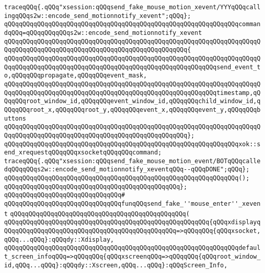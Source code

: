 \verb|traceqQQq{.qQQq"xsession:qQQqsend_fake_mouse_motion_xevent/YYYqQQqcallingqQQqs2w::encode_send_motionnotify_xevent";qQQq};|\newline
\verb|qQQqqQQqqQQqqQQqqQQqqQQqqQQqqQQqqQQqqQQqqQQqqQQqqQQqqQQqqQQqqQQqcommandqQQq=qQQqqQQqqQQqs2w::encode_send_motionnotify_xevent|\newline
\verb|qQQqqQQqqQQqqQQqqQQqqQQqqQQqqQQqqQQqqQQqqQQqqQQqqQQqqQQqqQQqqQQqqQQqqQQqqQQqqQQqqQQqqQQqqQQqqQQqqQQqqQQqqQQqqQQqqQQqqQQq{|\newline
\verb|qQQqqQQqqQQqqQQqqQQqqQQqqQQqqQQqqQQqqQQqqQQqqQQqqQQqqQQqqQQqqQQqqQQqqQQqqQQqqQQqqQQqqQQqqQQqqQQqqQQqqQQqqQQqqQQqqQQqqQQqqQQqqQQqsend_event_to,qQQqqQQqpropagate,qQQqqQQqevent_mask,|\newline
\verb|qQQqqQQqqQQqqQQqqQQqqQQqqQQqqQQqqQQqqQQqqQQqqQQqqQQqqQQqqQQqqQQqqQQqqQQqqQQqqQQqqQQqqQQqqQQqqQQqqQQqqQQqqQQqqQQqqQQqqQQqqQQqqQQqtimestamp,qQQqqQQqroot_window_id,qQQqqQQqevent_window_id,qQQqqQQqchild_window_id,qQQqqQQqroot_x,qQQqqQQqroot_y,qQQqqQQqevent_x,qQQqqQQqevent_y,qQQqqQQqbuttons|\newline
\verb|qQQqqQQqqQQqqQQqqQQqqQQqqQQqqQQqqQQqqQQqqQQqqQQqqQQqqQQqqQQqqQQqqQQqqQQqqQQqqQQqqQQqqQQqqQQqqQQqqQQqqQQqqQQqqQQqqQQqqQQq};|\newline
\newline
\verb|qQQqqQQqqQQqqQQqqQQqqQQqqQQqqQQqqQQqqQQqqQQqqQQqqQQqqQQqqQQqqQQqxok::send_xrequestqQQqqQQqxsocketqQQqqQQqcommand;|\newline
\verb|traceqQQq{.qQQq"xsession:qQQqsend_fake_mouse_motion_event/BOTqQQqcalledqQQqqQQqs2w::encode_send_motionnotify_xeventqQQq--qQQqDONE";qQQq};|\newline
\verb|qQQqqQQqqQQqqQQqqQQqqQQqqQQqqQQqqQQqqQQqqQQqqQQqqQQqqQQqqQQqqQQq();|\newline
\verb|qQQqqQQqqQQqqQQqqQQqqQQqqQQqqQQqqQQqqQQqqQQqqQQq};|\newline
\newline
\verb|qQQqqQQqqQQqqQQqqQQqqQQqqQQqqQQq#|\newline
\verb|qQQqqQQqqQQqqQQqqQQqqQQqqQQqqQQqfunqQQqsend_fake_''mouse_enter''_xevent|\newline
\verb|qQQqqQQqqQQqqQQqqQQqqQQqqQQqqQQqqQQqqQQqqQQqqQQq(|\newline
\verb|qQQqqQQqqQQqqQQqqQQqqQQqqQQqqQQqqQQqqQQqqQQqqQQqqQQqqQQq{qQQqxdisplayqQQqqQQqqQQqqQQqqQQqqQQqqQQqqQQqqQQqqQQqqQQqqQQq=>qQQqqQQq{qQQqxsocket,qQQq...qQQq}:qQQqdy::Xdisplay,|\newline
\verb|qQQqqQQqqQQqqQQqqQQqqQQqqQQqqQQqqQQqqQQqqQQqqQQqqQQqqQQqqQQqqQQqdefault_screen_infoqQQq=>qQQqqQQq{qQQqxscreenqQQq=>qQQqqQQq{qQQqroot_window_id,qQQq...qQQq}:qQQqdy::Xscreen,qQQq...qQQq}:qQQqScreen_Info,|\newline
